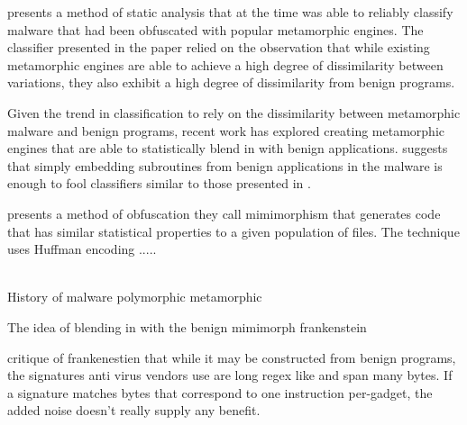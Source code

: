 \documentclass[finalcopy,short]{srpaper}
\begin{document}
  \cite{hmm_detect} presents a method of static analysis that at the time was
  able to reliably classify malware that had been obfuscated with popular
  metamorphic engines. The classifier presented in the paper relied on the
  observation that while existing metamorphic engines are able to achieve a high
  degree of dissimilarity between variations, they also exhibit a high degree of
  dissimilarity from benign programs.

  Given the trend in classification to rely on the dissimilarity between
  metamorphic malware and benign programs, recent work has explored creating
  metamorphic engines that are able to statistically blend in with benign
  applications.  \cite{hmm_evade} suggests that simply embedding subroutines
  from benign applications in the malware is enough to fool classifiers similar
  to those presented in \cite{hmm_detect}.

  \cite{mimimorph} presents a method of obfuscation they call mimimorphism that
  generates code that has similar statistical properties to a given population
  of files. The technique uses Huffman encoding .....


  ~\\

  History of malware
  polymorphic
  metamorphic

The idea of blending in with the benign
  mimimorph
  frankenstein

critique of frankenestien that while it may be constructed from benign programs,
the signatures anti virus vendors use are long regex like and span many bytes.
If a signature matches bytes that correspond to one instruction per-gadget, the
added noise doesn't really supply any benefit.



\end{document}
